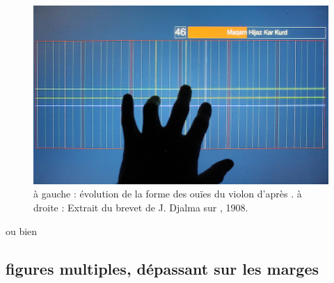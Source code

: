 \begin{figure}[!htbp]
	\centerline{
		\includegraphics[width=1.2\textwidth]{gfx/06_visual_representation/mpTUI_pitchgrid_72dpi.png}
	}
	\caption{à gauche : évolution de la forme des ouïes du violon d'après \cite{nia_evolution_2015}. à droite : Extrait du brevet de J. Djalma sur , 1908.}
	\label{fig:sandbox:single}
\end{figure}

ou bien

\begin{center}
\end{center}

\subsection*{figures multiples, dépassant sur les marges}


